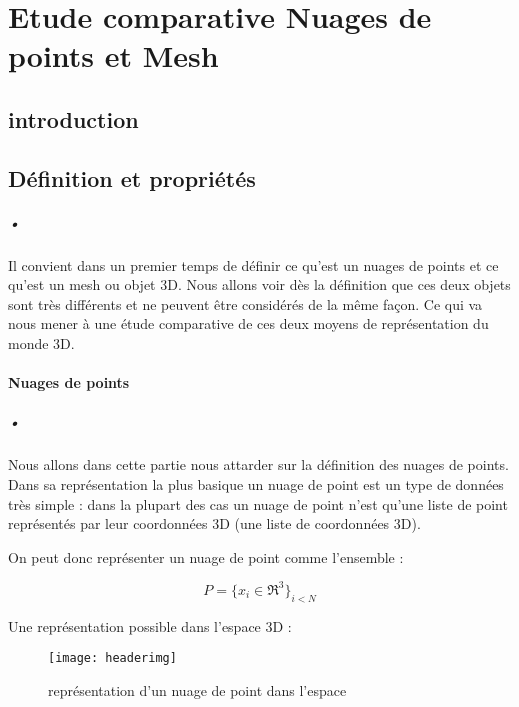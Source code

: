 
\chapter{Etude comparative Nuages de points et Mesh}

\section{introduction}



\section{Définition et propriétés}

\paragraph{•} Il convient dans un premier temps de définir ce qu'est un nuages de points et ce qu'est un mesh ou objet 3D. Nous allons voir dès la définition que ces deux objets sont très différents et ne peuvent être considérés de la même façon. Ce qui va nous mener à une étude comparative de ces deux moyens de représentation du monde 3D.

\subsubsection{Nuages de points}
\paragraph{•} Nous allons dans cette partie nous attarder sur la définition des nuages de points. Dans sa représentation la plus basique un nuage de point est un type de données très simple : dans la plupart des cas un nuage de point n'est qu'une liste de point représentés par leur coordonnées 3D (une liste de coordonnées 3D).

On peut donc représenter un nuage de point comme l'ensemble :

\[ P = \{ x_{i} \in \Re^{3} \}_{i<N} \]

Une représentation possible dans l'espace 3D :

\begin{figure}[h]
    \centering
    \texttt{[image: headerimg]}
    \caption{représentation d'un nuage de point dans l'espace}
    \label{fig:pointCloud1}
\end{figure}

